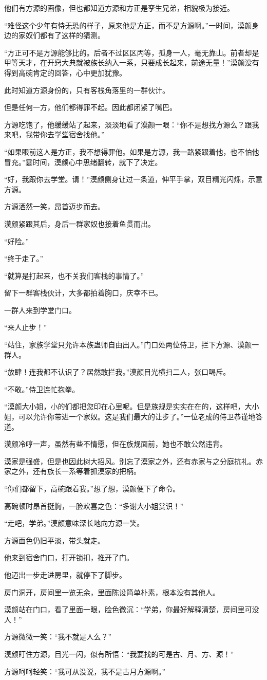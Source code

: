 \begin{this_body}
他们有方源的画像，但也都知道方源和方正是孪生兄弟，相貌极为接近。

“难怪这个少年有恃无恐的样子，原来他是方正，而不是方源啊。”一时间，漠颜身边的家奴们都有了这样的猜测。

“方正可不是方源能够比的。后者不过区区丙等，孤身一人，毫无靠山。前者却是甲等天才，在开窍大典就被族长纳入一系，只要成长起来，前途无量！”漠颜没有得到高碗肯定的回答，心中更加犹豫。

此时知道方源身份的，只有客栈角落里的一群伙计。

但是任何一方，他们都得罪不起。因此都闭紧了嘴巴。

方源吃饱了，他缓缓站了起来，淡淡地看了漠颜一眼：“你不是想找方源么？跟我来吧，我带你去学堂宿舍找他。”

“如果眼前这人是方正，我不想得罪他。如果是方源，我一路紧跟着他，也不怕他冒充。”霎时间，漠颜心中思绪翻转，就下了决定。

“好，我跟你去学堂。请！”漠颜侧身让过一条道，伸平手掌，双目精光闪烁，示意方源。

方源洒然一笑，昂首迈步而去。

漠颜紧跟其后，身后一群家奴也接着鱼贯而出。

“好险。”

“终于走了。”

“就算是打起来，也不关我们客栈的事情了。”

留下一群客栈伙计，大多都拍着胸口，庆幸不已。

一群人来到学堂门口。

“来人止步！”

“站住，家族学堂只允许本族蛊师自由出入。”门口处两位侍卫，拦下方源、漠颜一群人。

“放肆！连我都不认识了？居然敢拦我。”漠颜目光横扫二人，张口喝斥。

“不敢。”侍卫连忙抱拳。

“漠颜大小姐，小的们都把您印在心里呢。但是族规是实实在在的，这样吧，大小姐，可以允许你带进一个家奴。这是我们最大的让步了。”一位老成的侍卫恭谨地答道。

漠颜冷哼一声，虽然有些不情愿，但在族规面前，她也不敢公然违背。

漠家是强盛，但是也因此树大招风。别忘了漠家之外，还有赤家与之分庭抗礼。赤家之外，还有族长一系等着抓漠家的把柄。

“你们都留下，高碗跟着我。”想了想，漠颜便下了命令。

高碗顿时昂首挺胸，一脸欢喜之色：“多谢大小姐赏识！”

“走吧，学弟。”漠颜意味深长地向方源一笑。

方源面色仍旧平淡，带头就走。

他来到宿舍门口，打开锁扣，推开了门。

他迈出一步走进房里，就停下了脚步。

房门洞开，房间里一览无余，里面陈设简单朴素，根本没有其他人。

漠颜站在门口，看了里面一眼，脸色微沉：“学弟，你最好解释清楚，房间里可没人！”

方源微微一笑：“我不就是人么？”

漠颜盯住方源，目光一闪，似有所悟：“我要找的可是古、月、方、源！”

方源呵呵轻笑：“我可从没说，我不是古月方源啊。”

\end{this_body}

